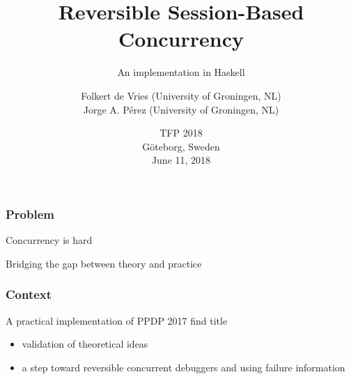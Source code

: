 \documentclass[12pt]{beamer}
\institute{University of Groningen, The Netherlands, \\ \texttt{}}
\title[Reversible Session-Based Concurrency]{Reversible Session-Based Concurrency}
\subtitle{An implementation in Haskell}
\author[de Vries \& P\'{e}rez]{Folkert de Vries (University of Groningen, NL)\\ 	
Jorge A. P\'{e}rez  (University of Groningen, NL)}
\date[June 11, 2018]
{
TFP 2018\\ G\"{o}teborg, Sweden
\\
June 11, 2018
}
\begin{document}
%
%
%


\begin{frame}

\begin{center}
\maketitle
\end{center}

\end{frame}


\begin{frame}
\frametitle{Problem}
\begin{center}

    \LARGE{Concurrency is hard}

    \Large{Bridging the gap between theory and practice}




\end{center}
\end{frame}

\begin{frame}
\frametitle{Context}
\begin{center}

    A practical implementation of PPDP 2017 find title

\begin{itemize}
    \item validation of theoretical ideas
    \item a step toward reversible concurrent debuggers and using failure information 
\end{itemize}

\end{center}
\end{frame}
\end{document}
